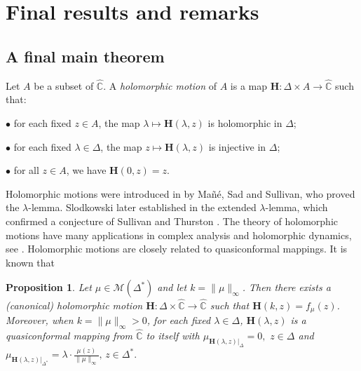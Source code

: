 \documentclass[11pt]{amsart}
\newtheorem{proposition}[theorem]{Proposition}
\theoremstyle{remark}
\theoremstyle{claim}
\theoremstyle{definition}
\theoremstyle{problem}
\theoremstyle{conjecture}
\theoremstyle{question}
\numberwithin{equation}{section}
\begin{document}
\section{\bf Final results and remarks}
\subsection{A final main theorem} Let $A$ be a subset of $\widehat{\mathbb{C}}$.  A  {\em holomorphic motion} of $A$ is a map $\mathbf{H}: \Delta \times A \rightarrow \widehat{\mathbb{C}}$  such that:

$\bullet$ for each fixed $z\in A$, the map $\lambda \mapsto  \mathbf{H}(\lambda, z)$ is holomorphic in $\Delta$;

$\bullet$  for each fixed $\lambda \in \Delta$, the map $z \mapsto  \mathbf{H}(\lambda, z)$ is injective in $\Delta$;

$\bullet$  for all $z\in A$, we have $\mathbf{H}(0, z)=z$.

Holomorphic motions were introduced in \cite{MSS} by Ma\~n\'e, Sad and Sullivan, who proved the $\lambda$-lemma. Slodkowski later established in \cite{Slo} the extended $\lambda$-lemma, which confirmed a conjecture of Sullivan and Thurston \cite{ST}. The theory of holomorphic motions have many applications in complex analysis and holomorphic dynamics, see \cite{AIM}. Holomorphic motions are closely related to quasiconformal mappings. It is known that
\begin{proposition}\label{last}
Let $\mu\in \mathcal{M}(\Delta^{*})$ and let $k=\|\mu\|_{\infty}$. Then there exists a (canonical) holomorphic motion $\mathbf{H}: \Delta \times \widehat{\mathbb{C}}\rightarrow \widehat{\mathbb{C}}$ such that $\mathbf{H}(k, z)=f_{\mu}(z)$. Moreover, when $k=\|\mu\|_{\infty}>0$, for each fixed $\lambda\in \Delta$, $\mathbf{H}(\lambda,z)$ is a quasiconformal mapping from $\widehat{\mathbb{C}}$ to itself with
$\mu_{\mathbf{H}(\lambda, z)|_{\Delta}}=0,\,\, z\in \Delta$ and $\mu_{\mathbf{H}(\lambda, z)|_{\Delta^{*}}}=\lambda \cdot \frac{\mu(z)}{\|\mu\|_{\infty}},\, z\in \Delta^{*}.$
\end{proposition}
\end{document}

